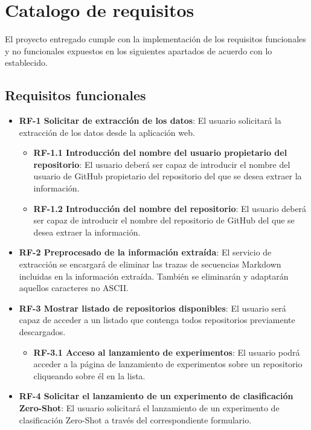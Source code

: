 \section{Catalogo de requisitos}

El proyecto entregado cumple con la implementación de los requisitos funcionales y no funcionales expuestos en los siguientes apartados de acuerdo con lo establecido.

\subsection{Requisitos funcionales}

\begin{itemize} [\textbullet]
    \item \textbf{RF-1 Solicitar de extracción de los datos}: El usuario solicitará la extracción de los datos desde la aplicación web.
    \begin{itemize} [\textbullet]
        \item \textbf{RF-1.1 Introducción del nombre del usuario propietario del repositorio}: El usuario deberá ser capaz de introducir el nombre del usuario de GitHub propietario del repositorio del que se desea extraer la información.
        \item \textbf{RF-1.2 Introducción del nombre del repositorio}: El usuario deberá ser capaz de introducir el nombre del repositorio de GitHub del que se desea extraer la información.
    \end{itemize}
    \item \textbf{RF-2 Preprocesado de la información extraída}: El servicio de extracción se encargará de eliminar las trazas de secuencias Markdown incluidas en la información extraída. También se eliminarán y adaptarán aquellos caracteres no ASCII.
    \item \textbf{RF-3 Mostrar listado de repositorios disponibles}: El usuario será capaz de acceder a un listado que contenga todos repositorios previamente descargados.
    \begin{itemize} [\textbullet]
        \item \textbf{RF-3.1 Acceso al lanzamiento de experimentos}: El usuario podrá acceder a la página de lanzamiento de experimentos sobre un repositorio cliqueando sobre él en la lista.
    \end{itemize}
    \item \textbf{RF-4 Solicitar el lanzamiento de un experimento de clasificación Zero-Shot}: El usuario solicitará el lanzamiento de un experimento de clasificación Zero-Shot a través del correspondiente formulario.

\end{itemize}
